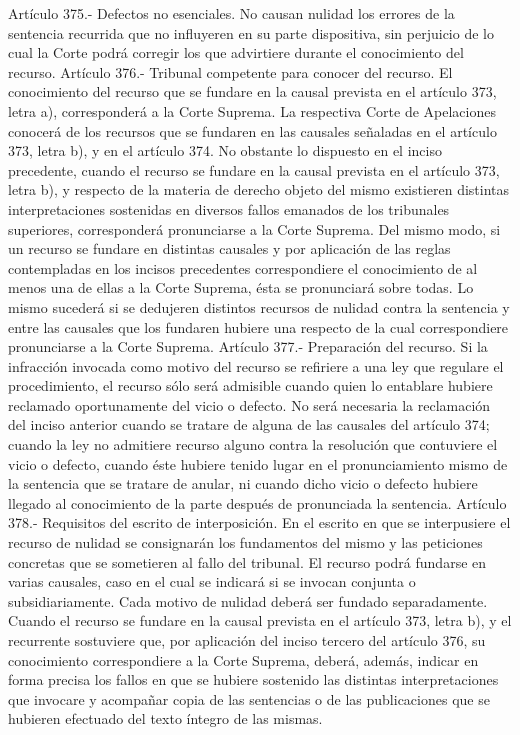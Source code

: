     Artículo 375.- Defectos no esenciales. No causan nulidad los errores de la sentencia recurrida que no influyeren en su parte dispositiva, sin perjuicio de lo cual la Corte podrá corregir los que advirtiere durante el conocimiento del recurso.
    Artículo 376.- Tribunal competente para conocer del recurso. El conocimiento del recurso que se fundare en la causal prevista en el artículo 373, letra a), corresponderá a la Corte Suprema.
    La respectiva Corte de Apelaciones conocerá de los recursos que se fundaren en las causales señaladas en el artículo 373, letra b), y en el artículo 374.
    No obstante lo dispuesto en el inciso precedente, cuando el recurso se fundare en la causal prevista en el artículo 373, letra b), y respecto de la materia de derecho objeto del mismo existieren distintas interpretaciones sostenidas en diversos fallos emanados de los tribunales superiores, corresponderá pronunciarse a la Corte Suprema.
    Del mismo modo, si un recurso se fundare en distintas causales y por aplicación de las reglas contempladas en los incisos precedentes correspondiere el conocimiento de al menos una de ellas a la Corte Suprema, ésta se pronunciará sobre todas. Lo mismo sucederá si se dedujeren distintos recursos de nulidad contra la sentencia y entre las causales que los fundaren hubiere una respecto de la cual correspondiere pronunciarse a la Corte Suprema.
    Artículo 377.- Preparación del recurso. Si la infracción invocada como motivo del recurso se refiriere a una ley que regulare el procedimiento, el recurso sólo será admisible cuando quien lo entablare hubiere reclamado oportunamente del vicio o defecto.
    No será necesaria la reclamación del inciso anterior cuando se tratare de alguna de las causales del artículo 374; cuando la ley no admitiere recurso alguno contra la resolución que contuviere el vicio o defecto, cuando éste hubiere tenido lugar en el pronunciamiento mismo de la sentencia que se tratare de anular, ni cuando dicho vicio o defecto hubiere llegado al conocimiento de la parte después de pronunciada la sentencia.
    Artículo 378.- Requisitos del escrito de interposición. En el escrito en que se interpusiere el recurso de nulidad se consignarán los fundamentos del mismo y las peticiones concretas que se sometieren al fallo del tribunal.
    El recurso podrá fundarse en varias causales, caso en el cual se indicará si se invocan conjunta o subsidiariamente. Cada motivo de nulidad deberá ser fundado separadamente.
    Cuando el recurso se fundare en la causal prevista en el artículo 373, letra b), y el recurrente sostuviere que, por aplicación del inciso tercero del artículo 376, su conocimiento correspondiere a la Corte Suprema, deberá, además, indicar en forma precisa los fallos en que se hubiere sostenido las distintas interpretaciones que invocare y acompañar copia de las sentencias o de las publicaciones que se hubieren efectuado del texto íntegro de las mismas.
